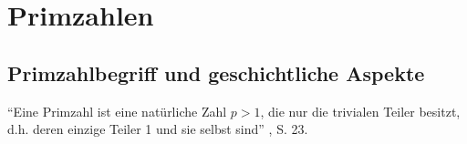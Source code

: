 %
%

\chapter{Primzahlen}

\section{Primzahlbegriff und geschichtliche Aspekte}
\begin{mydef}[Primzahl]
``Eine Primzahl ist eine natürliche Zahl $p > 1$, die nur 
die trivialen Teiler besitzt, d.h. deren einzige Teiler
1 und sie selbst sind'' \cite{schichlsteinbauer}, S. 23.
\end{mydef}
\vspace{-.5cm}

